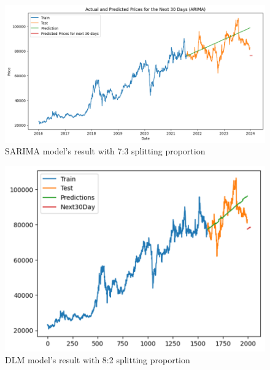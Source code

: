\documentclass{ieeeojies}
\begin{document}
\begin{figure}[H]
  \centering
  \begin{minipage}{0.8\linewidth}
    \centering
    \includegraphics[width=\linewidth]{bibliography/SARIMA_VCB73.png}
    \caption{SARIMA model's result with 7:3 splitting proportion}
    \label{fig12}
  \end{minipage}
\end{figure}
\begin{figure}[H]
  \centering
  \begin{minipage}{0.8\linewidth}
    \centering
    \includegraphics[width=\linewidth]{bibliography/DLM_VCB82.png}
    \caption{DLM model's result with 8:2 splitting proportion}
    \label{fig13}
  \end{minipage}
\end{figure}
\end{document}
